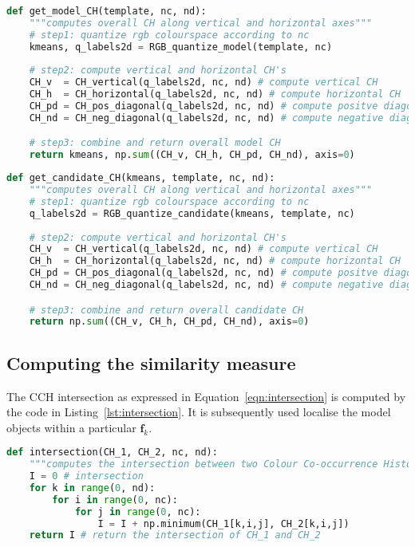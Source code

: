 \begin{lstlisting}[language=Python, caption={Computing model CH}, captionpos=b, label={lst:chmod}]
def get_model_CH(template, nc, nd):
    """computes overall CH along vertical and horizontal axes"""
    # step1: quantize rgb colourspace according to nc
    kmeans, q_labels2d = RGB_quantize_model(template, nc)
    
    # step2: compute vertical and horizontal CH's
    CH_v  = CH_vertical(q_labels2d, nc, nd) # compute vertical CH
    CH_h  = CH_horizontal(q_labels2d, nc, nd) # compute horizontal CH
    CH_pd = CH_pos_diagonal(q_labels2d, nc, nd) # compute positve diagonal CH
    CH_nd = CH_neg_diagonal(q_labels2d, nc, nd) # compute negative diagonal CH

    # step3: combine and return overall model CH
    return kmeans, np.sum((CH_v, CH_h, CH_pd, CH_nd), axis=0)
\end{lstlisting}

\begin{lstlisting}[language=Python, caption={Computing candidate CH}, captionpos=b, label={lst:chcand}]
def get_candidate_CH(kmeans, template, nc, nd):
    """computes overall CH along vertical and horizontal axes"""
    # step1: quantize rgb colourspace according to nc
    q_labels2d = RGB_quantize_candidate(kmeans, template, nc)
    
    # step2: compute vertical and horizontal CH's
    CH_v  = CH_vertical(q_labels2d, nc, nd) # compute vertical CH
    CH_h  = CH_horizontal(q_labels2d, nc, nd) # compute horizontal CH
    CH_pd = CH_pos_diagonal(q_labels2d, nc, nd) # compute positve diagonal CH
    CH_nd = CH_neg_diagonal(q_labels2d, nc, nd) # compute negative diagonal CH

    # step3: combine and return overall candidate CH
    return np.sum((CH_v, CH_h, CH_pd, CH_nd), axis=0)
\end{lstlisting}

\subsection{Computing the similarity measure}
The CCH intersection as expressed in
Equation~\ref{eqn:intersection} is computed by the code in
Listing~\ref{lst:intersection}. It is subsequently used localise the model
objects within a particular $\mathbf{f}_k$.

\begin{lstlisting}[language=Python, caption={Computing intersection of two CCH's}, captionpos=b, label={lst:intersection}]
def intersection(CH_1, CH_2, nc, nd):
    """computes the intersection between two Colour Co-occurrence Histograms""" 
    I = 0 # intersection
    for k in range(0, nd):
        for i in range(0, nc):
            for j in range(0, nc):
                I = I + np.minimum(CH_1[k,i,j], CH_2[k,i,j])
    return I # return the intersection of CH_1 and CH_2
\end{lstlisting}

